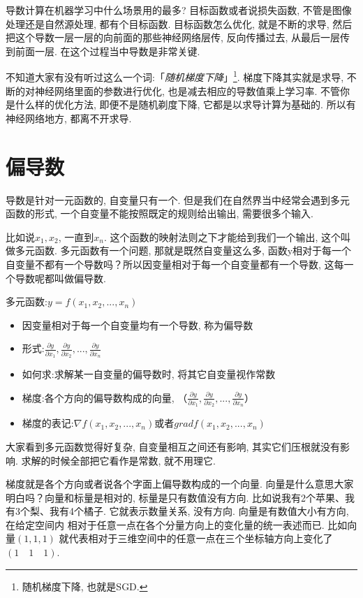 导数计算在机器学习中什么场景用的最多? 目标函数或者说损失函数, 不管是图像处理还是自然源处理, 都有个目标函数. 目标函数怎么优化, 就是不断的求导, 然后把这个导数一层一层的向前面的那些神经网络层传, 反向传播过去, 从最后一层传到前面一层. 在这个过程当中导数是非常关键. 

不知道大家有没有听过这么一个词:「\textit{随机梯度下降}」\footnote{随机梯度下降, 也就是SGD. }. 梯度下降其实就是求导, 不断的对神经网络里面的参数进行优化, 也是减去相应的导数值乘上学习率. 不管你是什么样的优化方法, 即便不是随机剃度下降, 它都是以求导计算为基础的. 所以有神经网络地方, 都离不开求导. 

\section{偏导数}

导数是针对一元函数的, 自变量只有一个. 但是我们在自然界当中经常会遇到多元函数的形式, 一个自变量不能按照既定的规则给出输出, 需要很多个输入. 

比如说$x_1, x_2$, 一直到$x_n$. 这个函数的映射法则之下才能给到我们一个输出, 这个叫做多元函数. 多元函数有一个问题, 那就是既然自变量这么多, 函数y相对于每一个自变量不都有一个导数吗？所以因变量相对于每一个自变量都有一个导数, 这每一个导数呢都叫做偏导数. 

多元函数:$y=f(x_1, x_2, ..., x_n)$

\begin{itemize}
  \item 因变量相对于每一个自变量均有一个导数, 称为偏导数
  \item 形式:$\frac{\partial y}{\partial x_1}, \frac{\partial y}{\partial x_2}, ..., \frac{\partial y}{\partial x_n}$
  \item 如何求:求解某一自变量的偏导数时, 将其它自变量视作常数
  \item 梯度:各个方向的偏导数构成的向量, （$\frac{\partial y}{\partial x_1},\frac{\partial y}{\partial x_2}, ..., \frac{\partial y}{\partial x_n}$）
  \item 梯度的表记:$\nabla f(x_1, x_2, ..., x_n)$或者$grad f(x_1, x_2, ..., x_n)$
\end{itemize}

大家看到多元函数觉得好复杂, 自变量相互之间还有影响, 其实它们压根就没有影响. 求解的时候全部把它看作是常数, 就不用理它. 

梯度就是各个方向或者说各个字面上偏导数构成的一个向量. 向量是什么意思大家明白吗？向量和标量是相对的, 标量是只有数值没有方向. 比如说我有2个苹果、我有3个梨、我有4个橘子. 它就表示数量关系, 没有方向. 向量是有数值大小有方向, 在给定空间内 相对于任意一点在各个分量方向上的变化量的统一表述而已. 比如向量$(1, 1, 1)$ 就代表相对于三维空间中的任意一点在三个坐标轴方向上变化了 $(1 \quad 1 \quad 1)$. 

